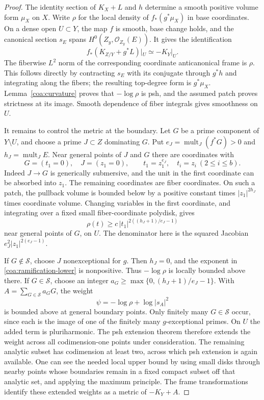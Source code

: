 \begin{proof}
The identity section of $K_X+L$ and $h$ determine a smooth positive volume
form $\mu_X$ on $X$.  Write $\rho$ for the local density of
$f_*(g^*\mu_X)$ in base coordinates.  On a dense open $U\subset Y$, the
map $f$ is smooth, base change holds, and the canonical section $s_E$
spans $H^0(Z_y,\mathcal O_{Z_y}(E))$.  It gives the identification
\[
 f_*(K_{Z/Y}+g^*L)|_U\simeq -K_Y|_U.
\]
The fiberwise $L^2$ norm of the corresponding coordinate anticanonical
frame is $\rho$.  This follows directly by contracting $s_E$ with its
conjugate through $g^*h$ and integrating along the fibers; the resulting
top-degree form is $g^*\mu_X$.  Lemma~\ref{coa:curvature} proves that
$-\log\rho$ is psh, and the assumed patch proves strictness at its image.
Smooth dependence of fiber integrals gives smoothness on $U$.

It remains to control the metric at the boundary.  Let $G$ be a prime
component of $Y\setminus U$, and choose a prime $J\subset Z$ dominating
$G$.  Put $e_J=\operatorname{mult}_J(f^*G)>0$ and
$h_J=\operatorname{mult}_J E$.  Near general points of $J$ and $G$ there
are coordinates with
\[
 G=(t_1=0),\quad J=(z_1=0),\qquad
 t_1=z_1^{e_J},\quad t_i=z_i\ (2\leq i\leq b).
\]
Indeed $J\to G$ is generically submersive, and the unit in the first
coordinate can be absorbed into $z_1$.  The remaining coordinates are
fiber coordinates.  On such a patch, the pullback volume is bounded below
by a positive constant times $|z_1|^{2h_J}$ times coordinate volume.
Changing variables in the first coordinate, and integrating over a
fixed small fiber-coordinate polydisk, gives
\begin{equation}\label{coa:ramification-lower}
 \rho(t)\geq c\,|t_1|^{2((h_J+1)/e_J-1)}
\end{equation}
near general points of $G$, on $U$.  The denominator here is the squared
Jacobian $e_J^2|z_1|^{2(e_J-1)}$.

If $G\notin\mathcal S$, choose $J$ nonexceptional for $g$.  Then $h_J=0$,
and the exponent in \eqref{coa:ramification-lower} is nonpositive.
Thus $-\log\rho$ is locally bounded above there.  If
$G\in\mathcal S$, choose an integer
$a_G\geq\max\{0,(h_J+1)/e_J-1\}$.  With
$A=\sum_{G\in\mathcal S}a_GG$, the weight
\[
 \psi=-\log\rho+\log|s_A|^2
\]
is bounded above at general boundary points.  Only finitely many
$G\in\mathcal S$ occur, since each is the image of one of the finitely
many $g$-exceptional primes.  On $U$ the added term is pluriharmonic.
The psh extension theorem therefore extends the weight across all
codimension-one points under consideration.  The remaining analytic
subset has codimension at least two, across which psh extension is
again available.  One can see the needed local upper bound by using
small disks through nearby points whose boundaries remain in a fixed
compact subset off that analytic set, and applying the maximum
principle.  The frame transformations identify these extended weights
as a metric of $-K_Y+A$.


\end{proof}
